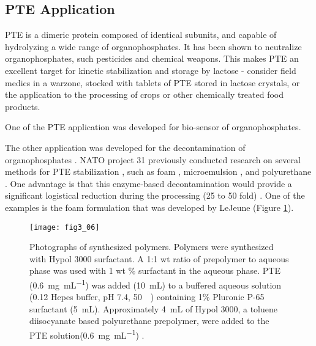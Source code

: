 \begin{refsection}
\subsection{PTE Application}

PTE is a dimeric protein composed of identical
subunits, and capable of hydrolyzing a wide range of organophosphates. It has
been shown to neutralize organophosphates, such pesticides and chemical
weapons. This makes PTE an excellent target for kinetic stabilization and
storage by lactose - consider field medics in a warzone, stocked with tablets
of PTE stored in lactose crystals, or the application to the processing of
crops or other chemically treated food products.

One of the PTE application was developed for bio-sensor of organophosphates. 

The other application was developed for the decontamination of
organophosphates
\cite{Cheng1996,LeJeune1997,Little1989,Chen1998,Gill2000,Havens1993,Masson2009a}.
NATO project 31 previously conducted research on several methods for PTE
stabilization \cite{Defrank}, such as foam \cite{LeJeune1997}, microemulsion
\cite{Cheng1996}, and polyurethane \cite{Defrank}. One advantage is that this
enzyme-based decontamination would provide a significant logistical reduction
during the processing (25 to 50 fold) \cite{Defrank}. One of the examples is
the foam formulation that was developed by LeJeune 
\cite{LeJeune1997} (Figure \ref{fig:pte-foam}).
\begin{figure}[htbp]
    \centering \texttt{[image: fig3\_06]}
    \caption[Photographs of synthesized polymers. Polymers were synthesized
    with Hypol 3000 surfactant. A 1:1 wt ratio of prepolymer to aqueous phase
    was used with 1 wt \% surfactant in the aqueous phase. PTE
    (\SI{0.6}{\mg\per\mL}) was added (\SI{10}{\mL}) to a buffered aqueous
    solution (\SI{0.12}{\Molar} Hepes buffer, pH 7.4,
    \SI{50}{\milli\Molar}) containing 1 \% Pluronic P-65 surfactant
    (\SI{5}{\mL}). Approximately \SI{4}{\mL} of Hypol 3000, a toluene
    diisocyanate based polyurethane prepolymer, were added to the PTE
solution(\SI{0.6}{\mg\per\mL}).]{Photographs of synthesized polymers. Polymers
    were synthesized with Hypol 3000 surfactant. A 1:1 wt ratio of prepolymer
    to aqueous phase was used with 1 wt \% surfactant in the aqueous phase. PTE
    (\SI{0.6}{\mg\per\mL}) was added (\SI{10}{\mL}) to a buffered aqueous
    solution (\SI{0.12}{\Molar} Hepes buffer, pH 7.4,
    \SI{50}{\milli\Molar}) containing 1\% Pluronic P-65 surfactant
    (\SI{5}{\mL}). Approximately \SI{4}{\mL} of Hypol 3000, a toluene
    diisocyanate based polyurethane prepolymer, were added to the PTE
    solution(\SI{0.6}{\mg\per\mL}) \cite{LeJeune1997}.} 
    \label{fig:pte-foam}
\end{figure}


\end{refsection}
